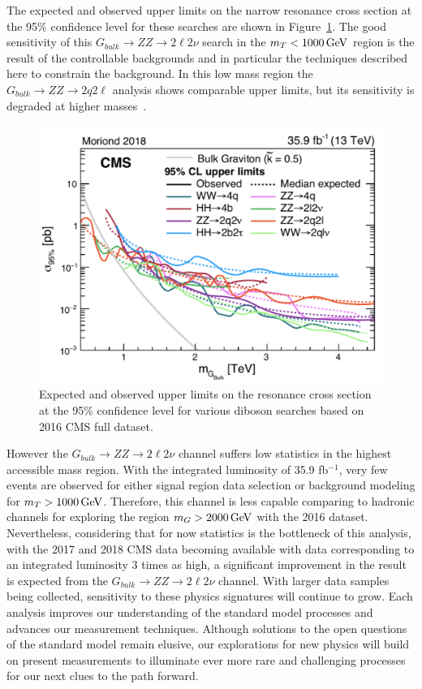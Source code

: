 The expected and observed upper limits on the narrow resonance cross section at the 95\% confidence level for these searches are shown in Figure~\ref{fig:sum_bulkGlimits}. The good sensitivity of this $G_{bulk}\rightarrow ZZ\rightarrow 2\ell 2\nu$ search in the $m_T < 1000\,\text{Ge\hspace{-.08em}V}$ region is the result of the controllable backgrounds and in particular the techniques described here to constrain the \Zjets background. In this low mass region the $G_{bulk}\rightarrow ZZ\rightarrow 2q 2\ell$ analysis shows comparable upper limits, but its sensitivity is degraded at higher masses~\cite{sum_zzqqll}.
\begin{figure}[htbp]
\begin{center}
\includegraphics[width=0.9\linewidth]{figures/sum_bulkGlimits.pdf}
\caption{Expected and observed upper limits on the resonance cross section at the 95\% confidence level for various diboson searches based on 2016 CMS full dataset.}
\label{fig:sum_bulkGlimits}
\end{center}
\end{figure}

\vspace{0.3cm}
However the $G_{bulk}\rightarrow ZZ\rightarrow 2\ell 2\nu$ channel suffers low statistics in the highest accessible mass region. With the integrated luminosity of 35.9 fb$^{-1}$, very few events are observed for either signal region data selection or background modeling for $m_T >1000\,\text{Ge\hspace{-.08em}V}$. Therefore, this channel is less capable comparing to hadronic channels for exploring the region $m_G >2000\,\text{Ge\hspace{-.08em}V}$ with the 2016 dataset. Nevertheless, considering that for now statistics is the bottleneck of this analysis, with the 2017 and 2018 CMS data becoming available with data corresponding to an integrated luminosity 3 times as high, a significant improvement in the result is expected from the $G_{bulk}\rightarrow ZZ\rightarrow 2\ell 2\nu$ channel. With larger data samples being collected, sensitivity to these physics signatures will continue to grow. Each analysis improves our understanding of the standard model processes and advances our measurement techniques.  Although solutions to the open questions of the standard model remain elusive,  our explorations for new physics will build on present measurements to illuminate ever more rare and challenging processes for our next clues to the path forward.

